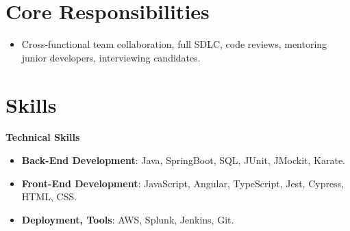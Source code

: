 \documentclass[letterpaper,11pt]{article}
\makeatletter
\newcommand{\resumeItem}[2]{
  \item\small{
    \textbf{#1}{: #2 \vspace{-2pt}}
  }
}
\newcommand{\resumeSubSubItem}[1]{
  \item\small{
    {#1 \vspace{-2pt}}
  }
}
\newcommand{\resumeSubheading}[4]{
  \vspace{-1pt}\item
    \begin{tabular*}{0.97\textwidth}[t]{l@{\extracolsep{\fill}}r}
      \textbf{#1} & #2 \\
      \textit{\small #3} & \textit{\small #4} \\
    \end{tabular*}\vspace{-5pt}
}
\newcommand{\resumeSubHeadingListStart}{\begin{itemize}[leftmargin=*]}
\newcommand{\resumeSubHeadingListEnd}{\end{itemize}}
\newcommand{\resumeItemListStart}{\begin{itemize}}
\newcommand{\resumeItemListEnd}{\end{itemize}\vspace{-5pt}}
\makeatother
\begin{document}
\section{Core Responsibilities}
  \resumeSubHeadingListStart
    \resumeSubSubItem
      {Cross-functional team collaboration, full SDLC, code reviews, mentoring junior developers, interviewing candidates.}
  \resumeSubHeadingListEnd    

\section{Skills}
  \textbf{\small Technical Skills}
    \resumeItemListStart
      \resumeItem{Back-End Development}
        {Java, SpringBoot, SQL, JUnit, JMockit, Karate.}
      \resumeItem{Front-End Development}
        {JavaScript, Angular, TypeScript, Jest, Cypress, HTML, CSS.}
      \resumeItem{Deployment, Tools}
        {AWS, Splunk, Jenkins, Git.}
    \resumeItemListEnd


\end{document}
